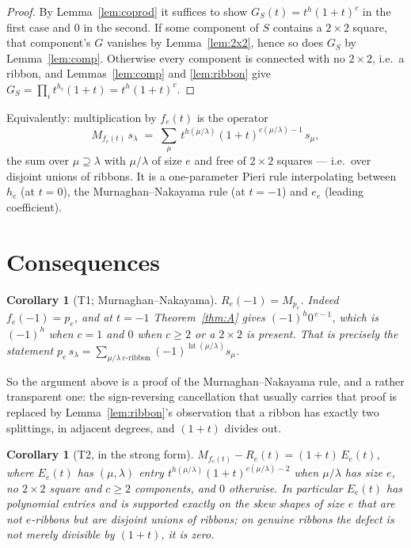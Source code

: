 \documentclass[11pt]{article}
\newtheorem{corollary}[theorem]{Corollary}
\theoremstyle{definition}
\DeclareMathOperator{\hgt}{ht}
\begin{document}
\begin{proof}
By Lemma~\ref{lem:coprod} it suffices to show $G_S(t)=t^{h}(1+t)^{c}$ in the first case and $0$
in the second. If some component of $S$ contains a $2\times2$ square, that component's $G$
vanishes by Lemma~\ref{lem:2x2}, hence so does $G_S$ by Lemma~\ref{lem:comp}. Otherwise every
component is connected with no $2\times2$, i.e.\ a ribbon, and Lemmas~\ref{lem:comp} and
\ref{lem:ribbon} give $G_S=\prod_i t^{h_i}(1+t)=t^{h}(1+t)^{c}$.
\end{proof}

Equivalently: multiplication by $f_e(t)$ is the operator
\[
M_{f_e(t)}\,s_\lambda \;=\; \sum_{\mu}\, t^{h(\mu/\lambda)}(1+t)^{c(\mu/\lambda)-1}\, s_\mu,
\]
the sum over $\mu\supseteq\lambda$ with $\mu/\lambda$ of size $e$ and free of $2\times2$
squares --- i.e.\ over disjoint unions of ribbons. It is a one-parameter Pieri rule
interpolating between $h_e$ (at $t=0$), the Murnaghan--Nakayama rule (at $t=-1$) and $e_e$
(leading coefficient).

\section{Consequences}

\begin{corollary}[T1; Murnaghan--Nakayama]\label{cor:T1}
$R_e(-1)=M_{p_e}$. Indeed $f_e(-1)=p_e$, and at $t=-1$ Theorem~\ref{thm:A} gives
$(-1)^{h}0^{\,c-1}$, which is $(-1)^{h}$ when $c=1$ and $0$ when $c\ge2$ or a $2\times2$ is
present. That is precisely the statement
$p_e\,s_\lambda=\sum_{\mu/\lambda\ e\text{-ribbon}}(-1)^{\hgt(\mu/\lambda)}s_\mu$.
\end{corollary}

So the argument above is a proof of the Murnaghan--Nakayama rule, and a rather transparent one:
the sign-reversing cancellation that usually carries that proof is replaced by
Lemma~\ref{lem:ribbon}'s observation that a ribbon has exactly two splittings, in adjacent
degrees, and $(1+t)$ divides out.

\begin{corollary}[T2, in the strong form]\label{cor:T2}
$M_{f_e(t)}-R_e(t)=(1+t)\,E_e(t)$, where $E_e(t)$ has $(\mu,\lambda)$ entry
$t^{h(\mu/\lambda)}(1+t)^{c(\mu/\lambda)-2}$ when $\mu/\lambda$ has size $e$, no $2\times2$
square and $c\ge2$ components, and $0$ otherwise. In particular $E_e(t)$ has polynomial
entries and is supported \emph{exactly} on the skew shapes of size $e$ that are not
$e$-ribbons but are disjoint unions of ribbons; on genuine ribbons the defect is not merely
divisible by $(1+t)$, it is zero.
\end{corollary}
\end{document}
